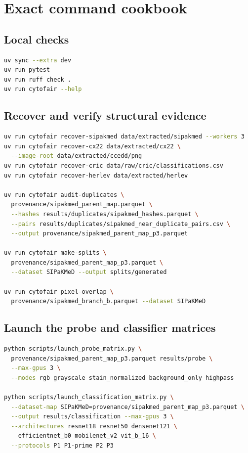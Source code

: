 \chapter{Exact command cookbook}\label{s1:ch:app07_exact_command_cookbook}

\section{Local checks}

\begin{lstlisting}[style=cyto,language=bash]
uv sync --extra dev
uv run pytest
uv run ruff check .
uv run cytofair --help
\end{lstlisting}

\section{Recover and verify structural evidence}

\begin{lstlisting}[style=cyto,language=bash]
uv run cytofair recover-sipakmed data/extracted/sipakmed --workers 3
uv run cytofair recover-cx22 data/extracted/cx22 \
  --image-root data/extracted/ccedd/png
uv run cytofair recover-cric data/raw/cric/classifications.csv
uv run cytofair recover-herlev data/extracted/herlev

uv run cytofair audit-duplicates \
  provenance/sipakmed_parent_map.parquet \
  --hashes results/duplicates/sipakmed_hashes.parquet \
  --pairs results/duplicates/sipakmed_near_duplicate_pairs.csv \
  --output provenance/sipakmed_parent_map_p3.parquet

uv run cytofair make-splits \
  provenance/sipakmed_parent_map_p3.parquet \
  --dataset SIPaKMeD --output splits/generated

uv run cytofair pixel-overlap \
  provenance/sipakmed_branch_b.parquet --dataset SIPaKMeD
\end{lstlisting}

\section{Launch the probe and classifier matrices}

\begin{lstlisting}[style=cyto,language=bash]
python scripts/launch_probe_matrix.py \
  provenance/sipakmed_parent_map_p3.parquet results/probe \
  --max-gpus 3 \
  --modes rgb grayscale stain_normalized background_only highpass

python scripts/launch_classification_matrix.py \
  --dataset-map SIPaKMeD=provenance/sipakmed_parent_map_p3.parquet \
  --output results/classification --max-gpus 3 \
  --architectures resnet18 resnet50 densenet121 \
    efficientnet_b0 mobilenet_v2 vit_b_16 \
  --protocols P1 P1-prime P2 P3
\end{lstlisting}

